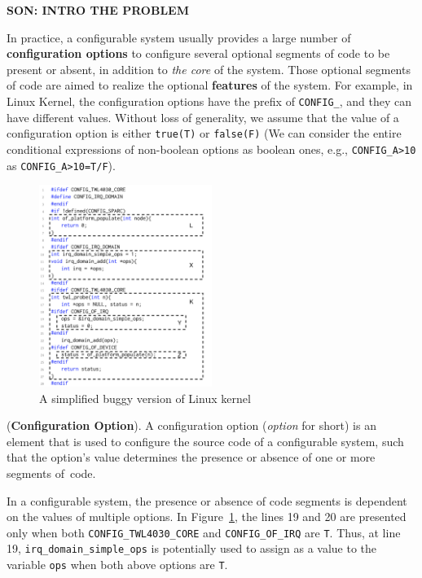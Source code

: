\textbf{SON: INTRO THE PROBLEM}

In practice, a configurable system usually provides a large number of
{\bf configuration options} to configure several optional segments of code
to be present or absent, in addition to
\textit{the core} of the system.
%
Those optional segments of code are aimed to realize the
optional \textbf{features} of the system.
%
For example, in Linux Kernel, the configuration options have the
prefix of \texttt{CONFIG\_}, and they can have different
values. Without loss of generality, we assume that the value of a
configuration option is either \texttt{true(T)} or
\texttt{false(F)} (We can consider the entire conditional
  expressions of non-boolean options as boolean ones, e.g.,
  \texttt{CONFIG\_A>10} as \texttt{CONFIG\_A>10=T/F}).

\begin{figure}
\centering
\includegraphics[width=0.5\textwidth]{example_bk.png}
\caption{A simplified buggy version of Linux kernel}
\label{example1}
\end{figure}


\begin{Definition}{({\bf Configuration Option}).}
A configuration option ({\em option} for short) is an element that is used
to configure the source code of a configurable system, such that the
option's value determines the presence or absence of one or more
segments of~code.
\end{Definition}

In a configurable system, the presence or absence of code segments is
dependent on the values of multiple options. In Figure~\ref{example1},
the lines 19 and 20 are presented only when both
\texttt{CONFIG\_TWL4030\_CORE} and \texttt{CONFIG\_OF\_IRQ} are
\texttt{T}. Thus, at line 19, \texttt{irq\_domain\_simple\_ops} is
potentially used to assign as a value to the variable \texttt{ops}
when both above options are \texttt{T}.

